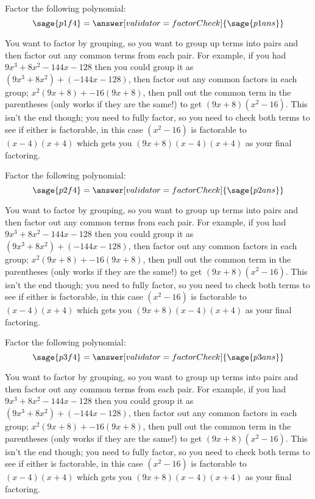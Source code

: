 \documentclass{ximera}
\begin{document}
\begin{problem}
    Factor the following polynomial:
    \[
        \sage{p1f4} = \answer[validator=factorCheck]{\sage{p1ans}}
    \]
    \begin{feedback}
        You want to factor by grouping, so you want to group up terms into pairs and then factor out any common terms from each pair. For example, if you had $9x^3 + 8x^2 - 144x - 128$ then you could group it as $(9x^3+8x^2) + (-144x -128)$, then factor out any common factors in each group; $x^2(9x+8) + -16(9x+8)$, then pull out the common term in the parentheses (only works if they are the same!) to get $(9x+8)(x^2-16)$. This isn't the end though; you need to fully factor, so you need to check both terms to see if either is factorable, in this case $(x^2-16)$ is factorable to $(x-4)(x+4)$ which gets you $(9x+8)(x-4)(x+4)$ as your final factoring.
    \end{feedback}
\end{problem}

\begin{problem}
    Factor the following polynomial:
    \[
        \sage{p2f4} = \answer[validator=factorCheck]{\sage{p2ans}}
    \]
    \begin{feedback}
        You want to factor by grouping, so you want to group up terms into pairs and then factor out any common terms from each pair. For example, if you had $9x^3 + 8x^2 - 144x - 128$ then you could group it as $(9x^3+8x^2) + (-144x -128)$, then factor out any common factors in each group; $x^2(9x+8) + -16(9x+8)$, then pull out the common term in the parentheses (only works if they are the same!) to get $(9x+8)(x^2-16)$. This isn't the end though; you need to fully factor, so you need to check both terms to see if either is factorable, in this case $(x^2-16)$ is factorable to $(x-4)(x+4)$ which gets you $(9x+8)(x-4)(x+4)$ as your final factoring.
    \end{feedback}
\end{problem}

\begin{problem}
    Factor the following polynomial:
    \[
        \sage{p3f4} = \answer[validator=factorCheck]{\sage{p3ans}}
    \]
    \begin{feedback}
        You want to factor by grouping, so you want to group up terms into pairs and then factor out any common terms from each pair. For example, if you had $9x^3 + 8x^2 - 144x - 128$ then you could group it as $(9x^3+8x^2) + (-144x -128)$, then factor out any common factors in each group; $x^2(9x+8) + -16(9x+8)$, then pull out the common term in the parentheses (only works if they are the same!) to get $(9x+8)(x^2-16)$. This isn't the end though; you need to fully factor, so you need to check both terms to see if either is factorable, in this case $(x^2-16)$ is factorable to $(x-4)(x+4)$ which gets you $(9x+8)(x-4)(x+4)$ as your final factoring.
    \end{feedback}
\end{problem}
\end{document}

